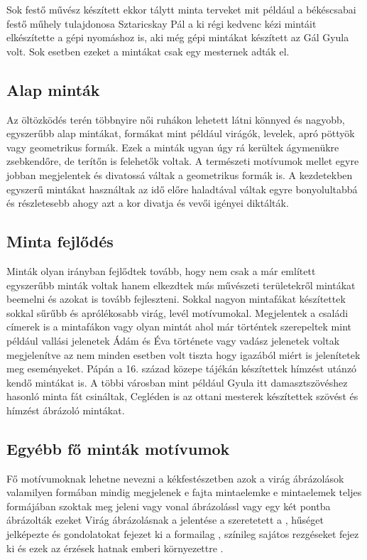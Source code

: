 \documentclass[fontsize=12pt, appendixprefix=true]{scrreprt}
\begin{document}
Sok festő művész készített ekkor tálytt minta terveket mit például a békéscsabai festő műhely tulajdonosa Sztaricskay Pál a ki régi kedvenc kézi mintáit elkészítette a gépi nyomáshoz is, aki még  gépi mintákat készített az Gál Gyula volt. Sok esetben ezeket a mintákat csak egy mesternek adták el.

\subsection{Alap minták}
Az öltözködés terén többnyire női ruhákon lehetett látni könnyed és nagyobb, egyszerűbb alap mintákat, formákat mint például virágók, levelek, apró pöttyök vagy geometrikus formák.
Ezek a minták ugyan úgy rá kerültek ágymenükre zsebkendőre, de terítőn is felehetők voltak.
A természeti motívumok mellet egyre jobban megjelentek és divatossá váltak a geometrikus formák is.
A kezdetekben egyszerű mintákat használtak az idő előre haladtával váltak egyre bonyolultabbá és részletesebb ahogy azt a kor divatja és vevői igényei diktálták.

\subsection{Minta fejlődés}
Minták olyan irányban fejlődtek tovább, hogy nem csak a már említett egyszerűbb minták voltak hanem  elkezdtek más művészeti területekről mintákat beemelni és azokat is tovább fejleszteni.
Sokkal nagyon mintafákat készítettek sokkal sűrűbb és aprólékosabb virág, levél motívumokal. Megjelentek a családi címerek is a mintafákon vagy olyan mintát ahol már történtek szerepeltek mint például vallási jelenetek Ádám és Éva története vagy vadász jelenetek voltak megjelenítve az nem minden esetben volt tiszta hogy igazából miért is jelenítetek meg eseményeket. Pápán a 16. század közepe tájékán  készítettek hímzést utánzó kendő mintákat is. A többi városban mint például Gyula itt damasztszövéshez hasonló minta fát csináltak, Cegléden is az ottani mesterek készítettek szövést és hímzést ábrázoló mintákat.

\subsection{Egyébb fő minták motívumok}
Fő motívumoknak lehetne nevezni a kékfestészetben azok a virág ábrázolások valamilyen formában mindig megjelenek e fajta mintaelemke  
e mintaelemek teljes formájában szoktak  meg jeleni vagy vonal ábrázolássl vagy egy két pontba ábrázolták ezeket 
Virág ábrázolásnak a jelentése a szeretetett a , hűséget jelképezte és gondolatokat fejezet ki a formailag , színileg sajátos rezgéseket fejez ki és ezek az érzések hatnak emberi környezettre .
\end{document}
